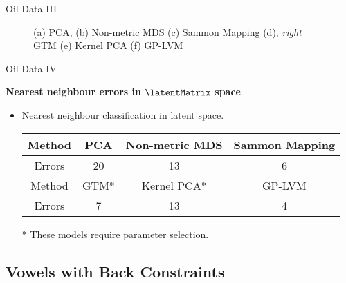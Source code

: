 Oil Data III

%
\begin{figure}
\hfill{}\hfill{}

\hfill{}\hfill{}

\caption{(a) PCA, (b) Non-metric MDS (c) Sammon Mapping (d), \emph{right} GTM
(e) Kernel PCA (f) GP-LVM}

\end{figure}


Oil Data IV

\textbf{Nearest neighbour errors in} $\latentMatrix$ \textbf{space}
\begin{itemize}
\item Nearest neighbour classification in latent space.


\begin{center}
\begin{tabular}{|c|c|c|c|}
\hline 
Method & PCA & Non-metric MDS & Sammon Mapping\tabularnewline
\hline 
Errors & 20 & 13 & 6\tabularnewline
\hline 
Method & GTM{*} & Kernel PCA{*} & GP-LVM\tabularnewline
\hline 
Errors & 7 & 13 & 4\tabularnewline
\hline
\end{tabular}
\par\end{center}

\begin{center}
{*} These models require parameter selection.
\par\end{center}

\end{itemize}

\subsection{Vowels with Back Constraints}

